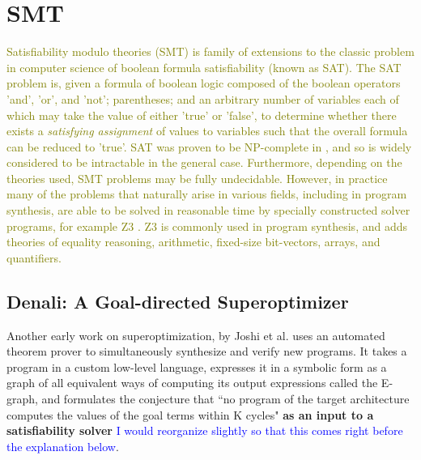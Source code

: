 \documentclass[12pt,twoside]{reedthesis}
\newcommand{\green}[1]{\textcolor{olive}{#1}}
\newcommand{\comment}[2]{\textbf{#1} \textcolor{blue}{#2}}
\newcommand{\addressed}[2]{{#1}}
\begin{document}
    \section{SMT}
        \green{
        Satisfiability modulo theories (SMT) is family of extensions to the classic problem in computer science of boolean formula satisfiability (known as SAT).
        The SAT problem is, given a formula of boolean logic composed of 
                the boolean operators 'and', 'or', and 'not';
                parentheses;
                and an arbitrary number of variables each of which may take the value of either 'true' or 'false',
            to determine whether there exists a \textit{satisfying assignment} of values to variables such that the overall formula can be reduced to 'true'.
        SAT was proven to be NP-complete in \cite{cook1971sat}, and so is widely considered to be intractable in the general case.
        Furthermore, depending on the theories used, SMT problems may be fully undecidable.
        However, in practice many of the problems that naturally arise in various fields, including in program synthesis, are able to be solved in reasonable time by specially constructed solver programs, for example Z3 \cite{demoura2008z3}.
        Z3 is commonly used in program synthesis, and adds theories of equality reasoning, arithmetic, fixed-size bit-vectors, arrays, and quantifiers.
        }

        \subsection{Denali: A Goal-directed Superoptimizer}
            Another early work on superoptimization, by Joshi et al. \cite{joshi2002denali} uses an automated theorem prover to simultaneously synthesize and verify new programs.
            It takes a program in a custom low-level language, expresses it in a symbolic form as a graph of all equivalent ways of computing its output expressions
                \addressed{called the E-graph}{I would be inclined to have a separate description of E-graphs, but it depends on the structure of the section},
                and formulates the conjecture that ``no program of the target architecture computes the values of the goal terms within K cycles"
                    \comment{as an input to a satisfiability solver}{I would reorganize slightly so that this comes right before the explanation below}. 
            
\end{document}
